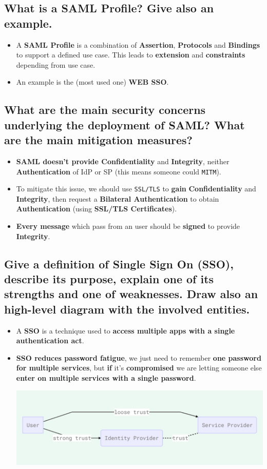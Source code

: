 \documentclass[9pt, letterpaper]{article}
\begin{document}
\subsection{What is a SAML Profile? Give also an example.}
\begin{itemize}
	\item A \textbf{SAML Profile} is a combination of \textbf{Assertion}, \textbf{Protocols} and \textbf{Bindings} to support a defined use case. This leads to \textbf{extension} and \textbf{constraints} depending from use case.
	\item An example is the (most used one) \textbf{WEB SSO}.
\end{itemize}

\subsection{What are the main security concerns underlying the deployment of SAML? What are the main mitigation measures?}
\begin{itemize}
	\item \textbf{SAML doesn't provide Confidentiality} and \textbf{Integrity}, neither \textbf{Authentication} of IdP or SP (this means someone could {\tt MITM}).
	\item To mitigate this issue, we should use {\tt SSL/TLS} to \textbf{gain} \textbf{Confidentiality} and \textbf{Integrity}, then request a \textbf{Bilateral Authentication} to obtain \textbf{Authentication} (using \textbf{SSL/TLS Certificates}).
	\item \textbf{Every message} which pass from an user should be \textbf{signed} to provide \textbf{Integrity}.
\end{itemize}

\subsection{Give a definition of Single Sign On (SSO), describe its purpose, explain one of its strengths and one of weaknesses. Draw also an high-level diagram with the involved entities.}
\begin{itemize}
	\item A \textbf{SSO} is a technique used to \textbf{access multiple apps with a single authentication act}.
	\item \textbf{SSO reduces password fatigue}, we just need to remember \textbf{one password for multiple services}, but \textbf{if} it's \textbf{compromised} we are letting someone else \textbf{enter on multiple services with a single password}.
	      \begin{center}
		      \includegraphics[scale=0.6]{SSO.png}
	      \end{center}
\end{itemize}
\end{document}
